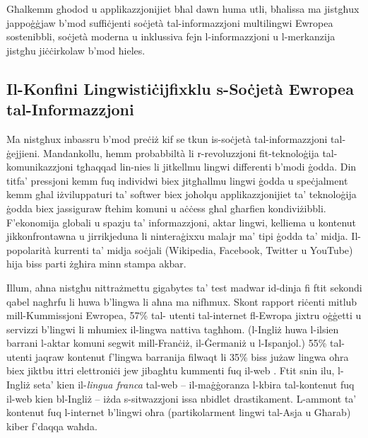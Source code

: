 \begin{multicols}{2}
Għalkemm għodod u applikazzjonijiet bħal dawn huma utli, bħalissa ma jistgħux jappoġġjaw b'mod suffiċjenti soċjetà tal-informazzjoni multilingwi Ewropea sostenibbli, soċjetà moderna u inklussiva fejn l-informazzjoni u l-merkanzija jistgħu jiċċirkolaw b’mod ħieles.

\subsection[Il-Konfini Lingwistiċi jfixklu s-Soċjetà Ewropea tal-Informazzjoni]{Il-Konfini Lingwistiċi\newline jfixklu s-Soċjetà Ewropea tal-Informazzjoni}
  
Ma nistgħux inbassru b’mod preċiż kif se tkun is-soċjetà tal-informazzjoni tal-ġejjieni. Mandankollu, hemm probabbiltà li r-revoluzzjoni fit-teknoloġija tal-komunikazzjoni tgħaqqad lin-nies li jitkellmu lingwi differenti b'modi ġodda. Din titfa' pressjoni kemm fuq individwi biex jitgħallmu lingwi ġodda u speċjalment kemm għal iżviluppaturi ta' softwer biex joħolqu applikazzjonijiet ta' teknoloġija ġodda biex jassiguraw ftehim komuni u aċċess għal għarfien kondiviżibbli. F’ekonomija globali u spazju ta’ informazzjoni, aktar lingwi, kelliema u kontenut  jikkonfrontawna u jirrikjeduna li ninteraġixxu malajr ma’ tipi ġodda ta’ midja. Il-popolarità kurrenti ta’ midja soċjali (Wikipedia, Facebook, Twitter u YouTube) hija biss parti żgħira minn stampa akbar.



Illum, aħna nistgħu nittrażmettu gigabytes ta’ test madwar id-dinja fi ftit sekondi qabel nagħrfu li huwa b’lingwa li aħna ma nifhmux. Skont rapport riċenti mitlub mill-Kummissjoni Ewropea, 57\% tal- utenti tal-internet fl-Ewropa jixtru oġġetti u servizzi b’lingwi li mhumiex il-lingwa nattiva tagħhom. (l-Ingliż huwa l-ilsien barrani l-aktar komuni segwit mill-Franċiż, il-Ġermaniż u l-Ispanjol.) 55\% tal-utenti jaqraw kontenut f'lingwa barranija filwaqt li 35\% biss jużaw lingwa oħra biex jiktbu ittri elettroniċi jew jibagħtu kummenti fuq il-web \cite{EC1}.  Ftit snin ilu, l-Ingliż seta’ kien il-\emph{lingua franca} tal-web -- il-maġġoranza l-kbira tal-kontenut fuq il-web kien bl-Ingliż -- iżda s-sitwazzjoni issa nbidlet drastikament. L-ammont ta’ kontenut fuq l-internet b’lingwi oħra (partikolarment lingwi tal-Asja u Għarab) kiber f'daqqa waħda.


\end{multicols}
